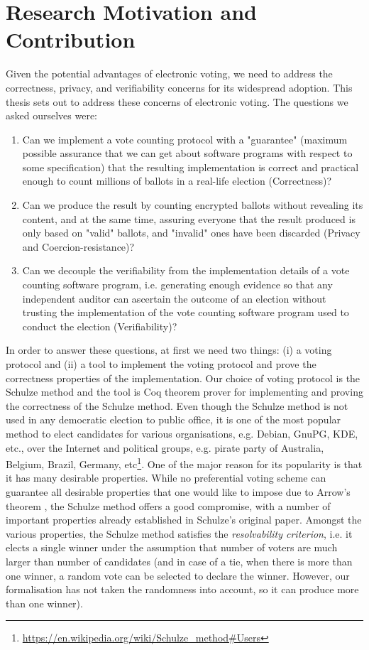\section{Research Motivation and Contribution}
Given the potential advantages of electronic voting,  we need to address
the correctness, privacy, and verifiability concerns for its widespread adoption. 
This thesis sets out to address these concerns of electronic voting. 
The questions we asked ourselves were:
 \begin{enumerate} 
  \item Can we implement a vote counting protocol with a "guarantee"
  (maximum possible assurance that we can get about software programs
   with respect to some specification) 
   that the resulting implementation is correct and  practical enough
    to count  millions of ballots in a real-life election (Correctness)?

  \item Can we produce the result by counting encrypted ballots without revealing 
  its content, and at the same time, 
  assuring everyone that the result produced is only based on "valid" ballots, 
  and "invalid" ones have been discarded  (Privacy and Coercion-resistance)?
 \item Can we decouple the verifiability from the implementation details of a vote counting software program, i.e. 
    generating enough evidence so that any independent auditor can 
    ascertain the outcome of an election without trusting the implementation 
    of the vote counting software program used to conduct the election (Verifiability)?
  \end{enumerate}


In order to answer these questions, at first we need two things: (i) a voting protocol and 
(ii) a tool to implement the voting protocol and prove the correctness properties of the implementation. 
Our choice of voting protocol is the   Schulze method \citep{Schulze:2011:NMC} and 
the tool is Coq \citep{Bertot:2004:ITP} theorem prover  for implementing and proving 
the correctness of  the Schulze method.
Even though the Schulze method is not used in any democratic election to public office,
it is one of the most popular method to elect candidates for various organisations, e.g. Debian, GnuPG, 
KDE,  etc., over the Internet and political groups,  e.g.  pirate party of Australia, Belgium, Brazil, 
Germany, etc\footnote{\url{https://en.wikipedia.org/wiki/Schulze_method#Users}}.
One of the major reason for its popularity is that it has many desirable properties.
While no preferential voting scheme can guarantee all desirable properties that one would
like to impose due to Arrow’s theorem \citep{Arrow:1950:DCS}, the Schulze method offers a good compromise, 
with a number of important properties already  established  in  Schulze’s  original  paper. 
Amongst the various  properties, the Schulze method satisfies the \textit{resolvability criterion}, 
i.e. it elects a single winner under the assumption that number of voters are much larger than
 number of candidates (and in case of a tie, when there is more than one winner, a random vote can be 
selected to declare the winner.  However, our formalisation 
has not taken the randomness into account, so it can produce more than one winner). 



